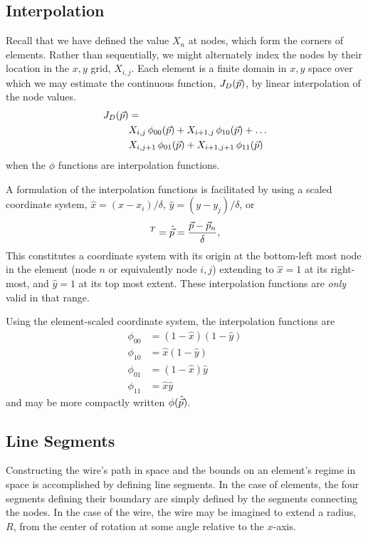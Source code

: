 \subsection{Interpolation}\label{sec:interpolate}

Recall that we have defined the value $X_n$ at nodes, which form the corners of elements.  Rather than sequentially, we might alternately index the nodes by their location in the $x,y$ grid, $X_{i,j}$.  Each element is a finite domain in $x,y$ space over which we may estimate the continuous function, $J_D(\vec{p})$, by linear interpolation of the node values.  
\begin{align}
J_D(\vec{p}) &= \nonumber\\
 &X_{i,j}\,\phi_{00} (\vec{p}) + X_{i+1,j}\,\phi_{10} (\vec{p}) + \dots\nonumber\\
 &X_{i,j+1}\,\phi_{01} (\vec{p}) + X_{i+1,j+1}\,\phi_{11} (\vec{p})
\end{align}
when the $\phi$ functions are interpolation functions.  

A formulation of the interpolation functions is facilitated by using a scaled coordinate system, $\hat{x} = (x-x_i) / \delta$, $\hat{y} = (y-y_j)/\delta$, or
\begin{align}
[\hat{x}, \hat{y}]^T = \hat{\p} = \frac{\p - \p_n}{\delta},
\end{align}
This constitutes a coordinate system with its origin at the bottom-left most node in the element (node $n$ or equivalently node $i,j$) extending to $\hat{x}=1$ at its right-most, and $\hat{y} = 1$ at its top most extent.  These interpolation functions are \emph{only} valid in that range.

Using the element-scaled coordinate system, the interpolation functions are
\begin{subequations}
\begin{align}
\phi_{00} &= (1-\hat{x})(1-\hat{y})\\
\phi_{10} &= \hat{x}(1-\hat{y})\\
\phi_{01} &= (1-\hat{x})\hat{y}\\
\phi_{11} &= \hat{x}\hat{y}
\end{align}
\end{subequations}
and may be more compactly written $\phi(\hat{\vec{p}})$.

\subsection{Line Segments}\label{sec:segments}

Constructing the wire's path in space and the bounds on an element's regime in space is accomplished by defining line segments.  In the case of elements, the four segments defining their boundary are simply defined by the segments connecting the nodes.  In the case of the wire, the wire may be imagined to extend a radius, $R$, from the center of rotation at some angle relative to the $x$-axis.

